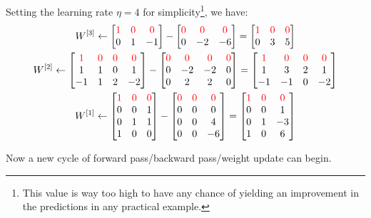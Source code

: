 Setting the learning rate $\eta = 4$ for simplicity\footnote{This value is way too high to have any chance of yielding an improvement in the predictions in any practical example.}, we have: 
\begin{gather*}
    W^{[3]} \gets \mqty[
        \color{red} 1 & \color{red} 0 & \color{red} 0 \\
        0 & 1 & -1
    ] - \mqty[
        \color{red} 0 & \color{red} 0 & \color{red} 0 \\
        0 & -2 & -6
    ] = \mqty[
        \color{red} 1 & \color{red} 0 & \color{red} 0 \\
        0 & 3 & 5
    ]\\
    W^{[2]} \gets \mqty[
        \color{red} 1 & \color{red} 0 & \color{red} 0 & \color{red} 0\\
        1 & 1 & 0 & 1\\
        -1 & 1 & 2 & -2
    ] - \mqty[
        \color{red} 0 & \color{red} 0 & \color{red} 0 & \color{red} 0 \\
        0 & -2 & -2 & 0 \\
        0 & 2 & 2 & 0 \\
    ] = \mqty[
        \color{red} 1 & \color{red} 0 & \color{red} 0 & \color{red} 0\\
        1 & 3 & 2 & 1\\
        -1 & -1 & 0 & -2
    ]\\
    W^{[1]} \gets \mqty[
        \color{red} 1 & \color{red} 0 & \color{red} 0 \\
        0 & 0 & 1 \\
        0 & 1 & 1 \\
        1 & 0 & 0
    ] - \mqty[
        \color{red} 0 & \color{red} 0 & \color{red} 0 \\
        0 & 0 & 0 \\
        0 & 0 & 4 \\
        0 & 0 & -6
    ] = \mqty[
        \color{red} 1 & \color{red} 0 & \color{red} 0 \\
        0 & 0 & 1 \\
        0 & 1 & -3 \\
        1 & 0 & 6
    ]
\end{gather*}

Now a new cycle of forward pass/backward pass/weight update can begin.
